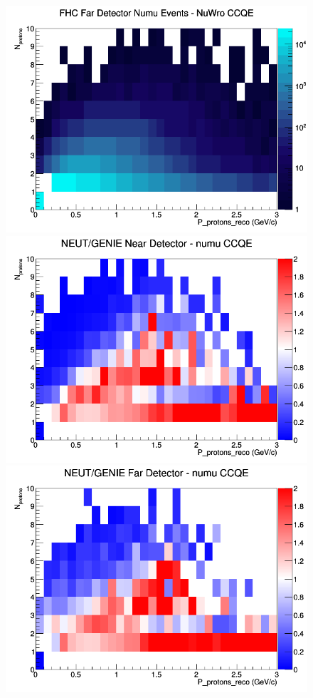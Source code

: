 \documentclass[12pt]{article}
\begin{document}
\begin{figure}[h]
\endminipage
{}
\includegraphics[width=\linewidth]{eff_N_P/GAr/protons/CCQE_FHC_FD_numu_N_P_NuWro.png}
\endminipage
\newline
{}
\includegraphics[width=\linewidth]{eff_N_P/GAr/protons/ratios/CCQE_NEUT_GENIE_numu_near_N_P.png}
\endminipage
{}
\includegraphics[width=\linewidth]{eff_N_P/GAr/protons/ratios/CCQE_NEUT_GENIE_numu_far_N_P.png}

\end{figure}
\end{document}
